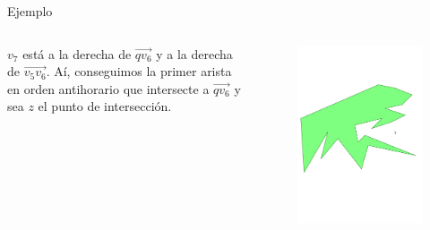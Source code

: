 \documentclass[aspectratio=169,xcolor=dvipsnames, t]{beamer}
\begin{document}
\begin{frame}{Ejemplo}
  \begin{columns}
    \begin{column}{0.3\textwidth}
      \raggedright %
      $v_7$ está a la derecha de $\overrightarrow{qv_{6}}$ y a la derecha de $\overrightarrow{v_{5}v_{6}}$. Aí, conseguimos la primer arista en orden antihorario que intersecte a $\overrightarrow{qv_{6}}$ y sea $z$ el punto de intersección.
    \end{column}
    \begin{column}{0.7\textwidth}
      \vspace{-2.5cm} %
      \begin{figure}
        \centering
        \includegraphics[width=1\linewidth, height=.95\textheight, page=19, keepaspectratio]{IPE/point_visibility.pdf}
      \end{figure}
    \end{column}
  \end{columns}
\end{frame}
\end{document}
